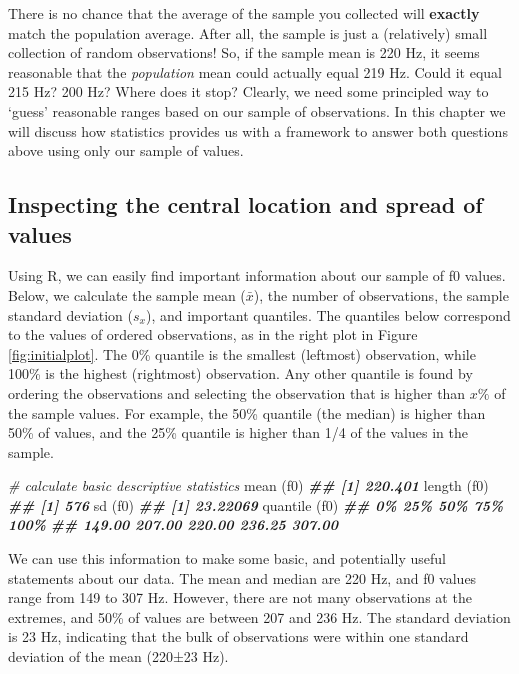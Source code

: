 \documentclass[
]{book}
\newenvironment{Shaded}{\begin{snugshade}}{\end{snugshade}}
\newcommand{\CommentTok}[1]{\textcolor[rgb]{0.56,0.35,0.01}{\textit{#1}}}
\newcommand{\DocumentationTok}[1]{\textcolor[rgb]{0.56,0.35,0.01}{\textbf{\textit{#1}}}}
\newcommand{\FunctionTok}[1]{\textcolor[rgb]{0.00,0.00,0.00}{#1}}
\newcommand{\NormalTok}[1]{#1}
\begin{document}
There is no chance that the average of the sample you collected will \textbf{exactly} match the population average. After all, the sample is just a (relatively) small collection of random observations! So, if the sample mean is 220 Hz, it seems reasonable that the \emph{population} mean could actually equal 219 Hz. Could it equal 215 Hz? 200 Hz? Where does it stop? Clearly, we need some principled way to `guess' reasonable ranges based on our sample of observations. In this chapter we will discuss how statistics provides us with a framework to answer both questions above using only our sample of values.

\hypertarget{inspecting-the-central-location-and-spread-of-values}{%
\subsection{Inspecting the central location and spread of values}\label{inspecting-the-central-location-and-spread-of-values}}

Using R, we can easily find important information about our sample of f0 values. Below, we calculate the sample mean (\(\bar{x}\)), the number of observations, the sample standard deviation (\(s_x\)), and important quantiles. The quantiles below correspond to the values of ordered observations, as in the right plot in Figure \ref{fig:initialplot}. The 0\% quantile is the smallest (leftmost) observation, while 100\% is the highest (rightmost) observation. Any other quantile is found by ordering the observations and selecting the observation that is higher than \(x\%\) of the sample values. For example, the 50\% quantile (the median) is higher than 50\% of values, and the 25\% quantile is higher than 1/4 of the values in the sample.

\begin{Shaded}
\begin{Highlighting}[]
\CommentTok{\# calculate basic descriptive statistics}
\FunctionTok{mean}\NormalTok{ (f0)}
\DocumentationTok{\#\# [1] 220.401}
\FunctionTok{length}\NormalTok{ (f0)}
\DocumentationTok{\#\# [1] 576}
\FunctionTok{sd}\NormalTok{ (f0)}
\DocumentationTok{\#\# [1] 23.22069}
\FunctionTok{quantile}\NormalTok{ (f0)}
\DocumentationTok{\#\#     0\%    25\%    50\%    75\%   100\% }
\DocumentationTok{\#\# 149.00 207.00 220.00 236.25 307.00}
\end{Highlighting}
\end{Shaded}

We can use this information to make some basic, and potentially useful statements about our data. The mean and median are 220 Hz, and f0 values range from 149 to 307 Hz. However, there are not many observations at the extremes, and 50\% of values are between 207 and 236 Hz. The standard deviation is 23 Hz, indicating that the bulk of observations were within one standard deviation of the mean (220±23 Hz).
\end{document}
